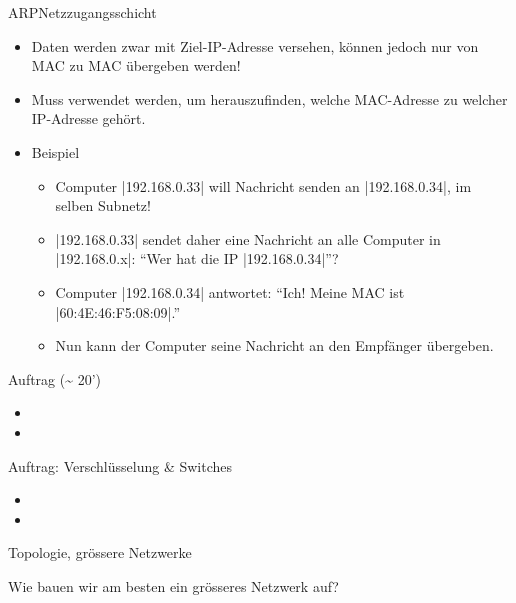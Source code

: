 \begin{frame}[fragile]{\acrfull{ARP}}{Netzzugangsschicht}
    \begin{itemize}[<+->]
        \item Daten werden zwar mit Ziel-\gls{IP}-Adresse versehen, können jedoch nur von \gls{MAC} zu \gls{MAC} übergeben werden!
        \item Muss verwendet werden, um herauszufinden, welche \gls{MAC}-Adresse zu welcher \gls{IP}-Adresse gehört.
        \item Beispiel
              \begin{itemize}[<+->]
                  \item Computer \commandbox|192.168.0.33| will Nachricht senden an \commandbox|192.168.0.34|, im selben Subnetz!
                  \item \commandbox|192.168.0.33| sendet daher eine Nachricht an alle Computer in \commandbox|192.168.0.x|: \enquote{Wer hat die \gls{IP} \commandbox|192.168.0.34|}?
                  \item Computer \commandbox|192.168.0.34| antwortet: \enquote{Ich! Meine \gls{MAC} ist \commandbox|60:4E:46:F5:08:09|.}
                  \item Nun kann der Computer seine Nachricht an den Empfänger übergeben.
              \end{itemize}
    \end{itemize}
\end{frame}

\begin{frame}{Auftrag (\textasciitilde{} 20')}
    \begin{itemize}
        \item {}
        \item {}
    \end{itemize}
\end{frame}

\begin{frame}{Auftrag: Verschlüsselung \& Switches}
    \begin{itemize}
        \item {}
        \item {}
    \end{itemize}
\end{frame}

\begin{frame}[shrink=8]{Topologie, grössere Netzwerke}
    \begin{center}
        Wie bauen wir am besten ein grösseres Netzwerk auf?
    \end{center}

    

\end{frame}

